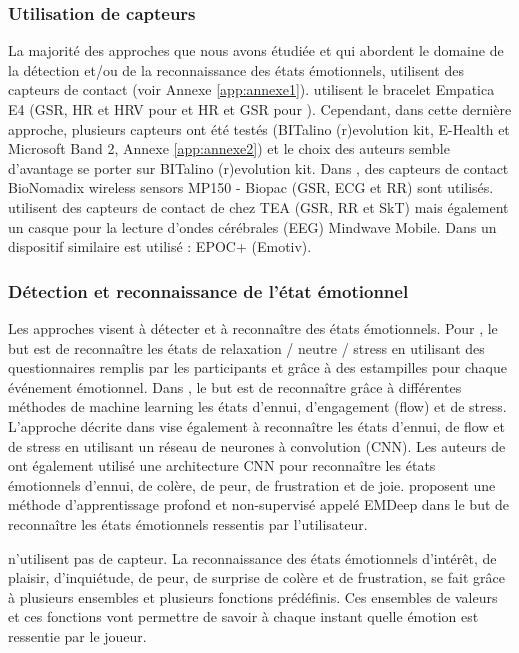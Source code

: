 \documentclass{article}
\begin{document}
        \subsubsection{Utilisation de capteurs}
            La majorité des approches que nous avons étudiée et qui abordent le domaine de la détection et/ou de la reconnaissance des états émotionnels, utilisent des capteurs de contact (voir Annexe \ref{app:annexe1}). 
            \cite{maier_et_al._2019,nalepa_et_al._2017,gizycka_et_al._2018} utilisent le bracelet Empatica E4 (GSR, HR et HRV pour \cite{maier_et_al._2019} et HR et GSR pour \cite{nalepa_et_al._2017,gizycka_et_al._2018}). 
            Cependant, dans cette dernière approche, plusieurs capteurs ont été testés (BITalino (r)evolution kit, E-Health et Microsoft Band 2, Annexe \ref{app:annexe2}) et le choix des auteurs semble d'avantage se porter sur BITalino (r)evolution kit. 
            Dans \cite{yang_et_al._2018}, des capteurs de contact BioNomadix wireless sensors MP150 - Biopac (GSR, ECG et RR) sont utilisés. 
            \cite{gal_2019,gal_et_al._2020} utilisent des capteurs de contact de chez TEA (GSR, RR et SkT) mais également un casque pour la lecture d'ondes cérébrales (EEG) Mindwave Mobile. 
            Dans \cite{carofiglio_et_al._2019} un dispositif similaire est utilisé : EPOC+ (Emotiv).\par 
        \subsubsection{Détection et reconnaissance de l'état émotionnel}
            Les approches visent à détecter et à reconnaître des états émotionnels. Pour \cite{nalepa_et_al._2017,gizycka_et_al._2018}, le but est de reconnaître les états de relaxation / neutre / stress en utilisant des questionnaires remplis par les participants et grâce à des estampilles pour chaque événement émotionnel. 
            Dans \cite{carofiglio_et_al._2019}, le but est de reconnaître grâce à différentes méthodes de machine learning les états d'ennui, d'engagement (flow) et de stress. 
            L'approche décrite dans \cite{maier_et_al._2019} vise également à reconnaître les états d'ennui, de flow et de stress en utilisant un réseau de neurones à convolution (CNN). 
            Les auteurs de \cite{yang_et_al._2018} ont également utilisé une architecture CNN pour reconnaître les états émotionnels d'ennui, de colère, de peur, de frustration et de joie. 
            \cite{gal_2019,gal_et_al._2020} proposent une méthode d'apprentissage profond et non-supervisé appelé EMDeep dans le but de reconnaître les états émotionnels ressentis par l'utilisateur.\par
            \cite{Mostefai_et_al._2019} n'utilisent pas de capteur. La reconnaissance des états émotionnels d'intérêt, de plaisir, d'inquiétude, de peur, de surprise de colère et de frustration, se fait grâce à plusieurs ensembles et plusieurs fonctions prédéfinis. Ces ensembles de valeurs et ces fonctions vont permettre de savoir à chaque instant quelle émotion est ressentie par le joueur.
\end{document}
